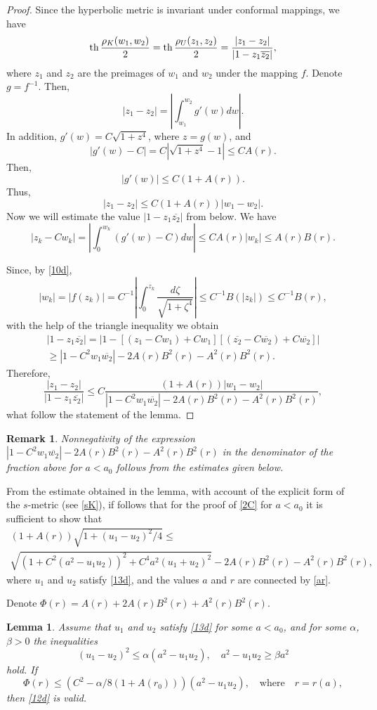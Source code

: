 \documentclass[12pt,a4paper]{amsart}
\newtheorem{lemma}{Lemma}
\newtheorem{remark}{Remark}
\def\th{\mathop{\rm th}\nolimits}
\begin{document}
\begin{proof}
Since the hyperbolic metric is invariant under conformal mappings, we have
$$
\th\frac{\rho_K(w_1,w_2)}{2}=\th\frac{\rho_U(z_1,z_2)}{2}=\frac{|z_1-z_2|}{|1-z_1\overline{z_2}|},
$$
where  $z_1$ and $z_2$ are the preimages of $w_1$ and $w_2$ under the mapping $f$. Denote $g=f^{-1}$. Then,
$$
|z_1-z_2|=\left|\int_{w_1}^{w_2}g'(w)dw\right|.
$$
In addition, $g'(w)=C \sqrt{1+z^4}$, where $z=g(w)$, and
$$
|g'(w)-C|=C |\sqrt{1+z^4}-1|
\le CA(r).
$$
Then,
$$
|g'(w)|\le C (1+A(r)).
$$
Thus,
$$
|z_1-z_2|\le C (1+A(r))|w_1-w_2|.
$$
Now we will estimate  the value $|1-z_1\overline{z_2}|$ from below.
We have
$$
|z_k-Cw_k|=\left| \int_0^{w_k}(g'(w)-C)dw\right|\le C A(r)|w_k|\le A(r)B(r).
$$

Since, by \eqref{10d},
$$
|w_k|=|f(z_k)|=C^{-1}\left|\int_0^{z_k}\frac{d\zeta}{\sqrt{1+\zeta^4}}\right|\le C^{-1}B(|z_k|)\le C^{-1}B(r),
$$
with the help of the triangle inequality we obtain
\begin{multline*}
|1-z_1\overline{z_2}|=|1-[(z_1-Cw_1)+Cw_1][(\overline{z_2}-C\overline{w_2})+C\overline{w_2}]|
\\
\ge |1-C^2w_1\overline{w_2}|-2A(r)B^2(r)-A^2(r)B^2(r).
\end{multline*}
Therefore,
$$
\frac{|z_1-z_2|}{|1-z_1\overline{z_2}|}\le C\frac{(1+A(r))|w_1-w_2|}{ |1-C^2w_1\overline{w_2}|-2A(r)B^2(r)-A^2(r)B^2(r)},
$$
what follow the statement of the lemma.
\end{proof}

\begin{remark}\label{rem1}
Nonnegativity of the expression $|1-C^2w_1\overline{w_2}|-2A(r)B^2(r)-A^2(r)B^2(r)$
 in the denominator of the fraction above for $a<a_0$ follows from the estimates given below.
\end{remark}

From the estimate obtained in the lemma, with account of the
explicit form of  the $s$-metric (see \eqref{sK}), if follows that
for the proof of \eqref{2C} for $a<a_0$ it is sufficient to show
that \begin{multline} \label{12d} (1+A(r))\sqrt{1+(u_1-u_2)^2/4}\le
\\
\sqrt{(1+C^2(a^2-u_1u_2))^2+C^4a^2(u_1+u_2)^2}-2A(r)B^2(r)-A^2(r)B^2(r),
\end{multline}
where $u_1$ and $u_2$ satisfy \eqref{13d}, and the values $a$ and $r$ are connected by \eqref{ar}.

Denote $\Phi(r)=A(r)+2A(r)B^2(r)+A^2(r)B^2(r)$.

\begin{lemma} \label{t9}
Assume that $u_1$ and $u_2$ satisfy \eqref{13d} for some $a<a_0$, and for some $\alpha$, $\beta>0$ the inequalities
\begin{equation}\label{abc}
(u_1-u_2)^2\le \alpha (a^2-u_1u_2), \quad a^2-u_1u_2\ge \beta a^2
\end{equation}
hold. If
\begin{equation}\label{16d}
\Phi(r)\le(C^2-\alpha/8(1+A(r_0)))(a^2-u_1u_2), \quad \text{where}\quad r=r(a),
\end{equation}
then \eqref{12d} is valid.
\end{lemma}
\end{document}
